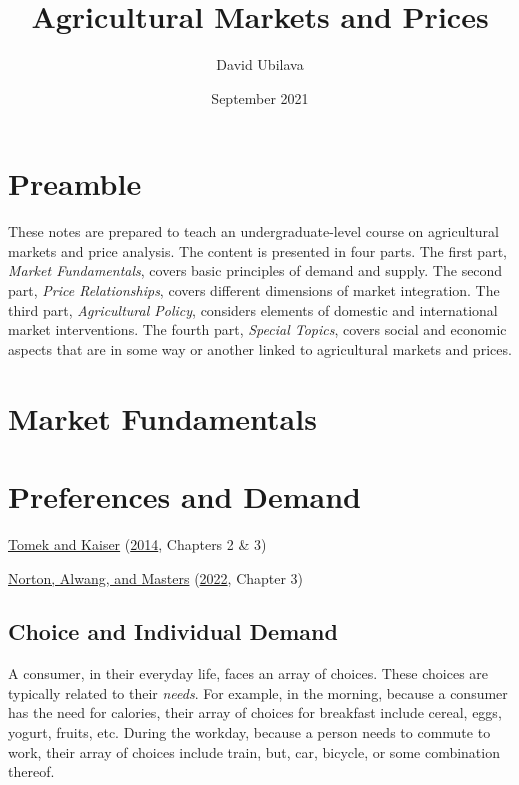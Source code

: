 \documentclass[
  oneside]{book}
\title{Agricultural Markets and Prices}
\author{David Ubilava}
\date{September 2021}
\begin{document}
\maketitle

{
\setcounter{tocdepth}{1}
\tableofcontents
}
\hypertarget{preamble}{%
\chapter*{Preamble}\label{preamble}}

These notes are prepared to teach an undergraduate-level course on agricultural markets and price analysis. The content is presented in four parts. The first part, \emph{Market Fundamentals}, covers basic principles of demand and supply. The second part, \emph{Price Relationships}, covers different dimensions of market integration. The third part, \emph{Agricultural Policy}, considers elements of domestic and international market interventions. The fourth part, \emph{Special Topics}, covers social and economic aspects that are in some way or another linked to agricultural markets and prices.

\hypertarget{market-fundamentals}{%
\chapter*{Market Fundamentals}\label{market-fundamentals}}

\hypertarget{preferences-and-demand}{%
\chapter{Preferences and Demand}\label{preferences-and-demand}}

\protect\hyperlink{ref-tomek2014}{Tomek and Kaiser} (\protect\hyperlink{ref-tomek2014}{2014}, Chapters 2 \& 3)

\protect\hyperlink{ref-norton2022}{Norton, Alwang, and Masters} (\protect\hyperlink{ref-norton2022}{2022}, Chapter 3)

\hypertarget{choice-and-individual-demand}{%
\section{Choice and Individual Demand}\label{choice-and-individual-demand}}

A consumer, in their everyday life, faces an array of choices. These choices are typically related to their \emph{needs}. For example, in the morning, because a consumer has the need for calories, their array of choices for breakfast include cereal, eggs, yogurt, fruits, etc. During the workday, because a person needs to commute to work, their array of choices include train, but, car, bicycle, or some combination thereof.
\end{document}
